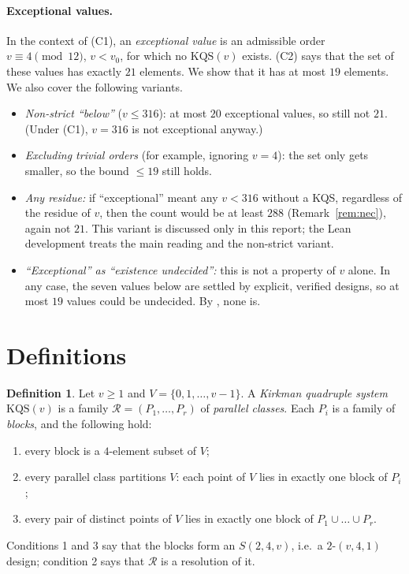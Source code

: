 \documentclass[11pt]{article}
\theoremstyle{definition}
\newtheorem{definition}[theorem]{Definition}
\theoremstyle{remark}
\begin{document}
\paragraph{Exceptional values.} In the context of (C1), an \emph{exceptional value} is an
admissible order $v\equiv4\pmod{12}$, $v<v_0$, for which no $\mathrm{KQS}(v)$ exists.
(C2) says that the set of these values has exactly $21$ elements. We show that it has at
most $19$ elements. We also cover the following variants.
\begin{itemize}
\item \emph{Non-strict ``below''} ($v\le316$): at most $20$ exceptional values, so still not
$21$. (Under (C1), $v=316$ is not exceptional anyway.)
\item \emph{Excluding trivial orders} (for example, ignoring $v=4$): the set only gets
smaller, so the bound $\le 19$ still holds.
\item \emph{Any residue:} if ``exceptional'' meant any $v<316$ without a KQS, regardless of
the residue of $v$, then the count would be at least $288$ (Remark~\ref{rem:nec}), again not
$21$. This variant is discussed only in this report; the Lean development treats the
main reading and the non-strict variant.
\item \emph{``Exceptional'' as ``existence undecided'':} this is not a property of $v$ alone.
In any case, the seven values below are settled by explicit, verified designs, so at most
$19$ values could be undecided. By \cite{hrw}, none is.
\end{itemize}

\section{Definitions}
\begin{definition}
Let $v\ge1$ and $V=\{0,1,\dots,v-1\}$. A \emph{Kirkman quadruple system}
$\mathrm{KQS}(v)$ is a family $\mathcal R=(P_1,\dots,P_r)$ of \emph{parallel classes}. Each
$P_i$ is a family of \emph{blocks}, and the following hold:
\begin{enumerate}
\item every block is a $4$-element subset of $V$;
\item every parallel class partitions $V$: each point of $V$ lies in exactly one block of
$P_i$;
\item every pair of distinct points of $V$ lies in exactly one block of
$P_1\cup\dots\cup P_r$.
\end{enumerate}
Conditions 1 and 3 say that the blocks form an $S(2,4,v)$, i.e.\ a $2$-$(v,4,1)$ design;
condition 2 says that $\mathcal R$ is a resolution of it.
\end{definition}
\end{document}
